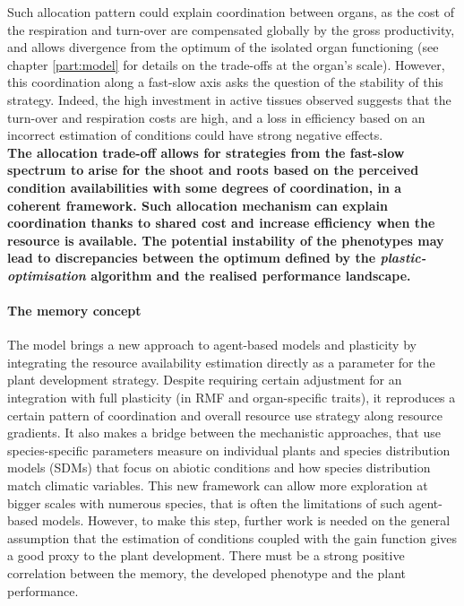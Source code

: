 Such allocation pattern could explain coordination between organs, as the cost of the respiration and turn-over are compensated globally by the gross productivity, and allows divergence from the optimum of the isolated organ functioning (see chapter \ref{part:model} for details on the trade-offs at the organ's scale). However, this coordination along a fast-slow axis asks the question of the stability of this strategy. Indeed, the high investment in active tissues observed suggests that the turn-over and respiration costs are high, and a loss in efficiency based on an incorrect estimation of conditions could have strong negative effects. \\



\textbf{The allocation trade-off allows for strategies from the fast-slow spectrum to arise for the shoot and roots based on the perceived condition availabilities with some degrees of coordination, in a coherent framework. Such allocation mechanism can explain coordination thanks to shared cost and increase efficiency when the resource is available. The potential instability of the phenotypes may lead to discrepancies between the optimum defined by the \textit{plastic-optimisation} algorithm and the realised performance landscape. }

\paragraph{The memory concept}

The model \model brings a new approach to agent-based models and plasticity by integrating the resource availability estimation directly as a parameter for the plant development strategy. Despite requiring certain adjustment for an integration with full plasticity (in RMF and organ-specific traits), it reproduces a certain pattern of coordination and overall resource use strategy along resource gradients. It also makes a bridge between the mechanistic approaches, that use species-specific parameters measure on individual plants and species distribution models (SDMs) that focus on abiotic conditions and how species distribution match climatic variables. This new framework can allow more exploration at bigger scales with numerous species, that is often the limitations of such agent-based models. However, to make this step, further work is needed on the general assumption that the estimation of conditions coupled with the gain function gives a good proxy to the plant development. There must be a strong positive correlation between the memory, the developed phenotype and the plant performance. 

